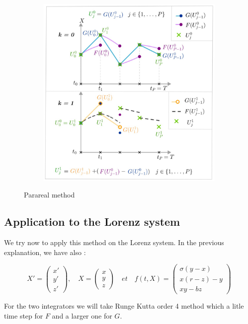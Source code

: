 \begin{figure}
{\begin{minipage}[c]{\linewidth}
\begin{subfigure}[t]{.30\linewidth}
	\end{subfigure} 
	\begin{subfigure}[t]{.30\linewidth}      
		\includegraphics[width=\linewidth]{"images/parareal_6.jpg"}
	\end{subfigure}
	\end{minipage}}
	\caption{Parareal method}
	
\end{figure}

\subsection{Application to the Lorenz system}

We try now to apply this method on the Lorenz system. In the previous explanation, we have also :

$$X'=\begin{pmatrix}
    x' \\
    y' \\
    z'
\end{pmatrix}, \quad X=\begin{pmatrix}
    x \\
    y \\
    z
\end{pmatrix} \quad et \quad f(t,X)=\begin{pmatrix}
    \sigma(y-x) \\
    x(r-z)-y \\
    xy-bz
\end{pmatrix}$$

\noindent For the two integrators we will take Runge Kutta order 4 method which a litle time step for $F$ and a larger one for $G$.
